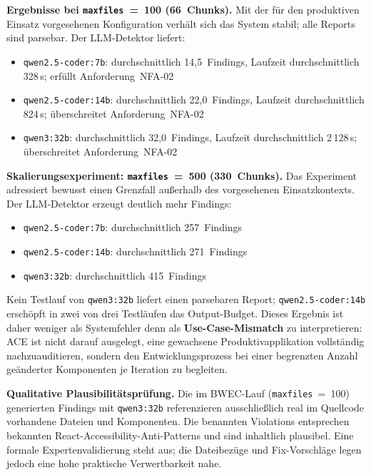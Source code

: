 \textbf{Ergebnisse bei \texttt{maxfiles}~=~100 (66~Chunks).}
Mit der für den produktiven Einsatz vorgesehenen Konfiguration verhält sich das System stabil; alle Reports sind parsebar. Der \ac{LLM}-Detektor liefert:
\begin{itemize}
  \item \texttt{qwen2.5-coder:7b}: durchschnittlich 14{,}5~Findings, Laufzeit durchschnittlich 328\,s; erfüllt Anforderung~\ac{NFA}-02
  \item \texttt{qwen2.5-coder:14b}: durchschnittlich 22{,}0~Findings, Laufzeit durchschnittlich 824\,s; überschreitet Anforderung~\ac{NFA}-02
  \item \texttt{qwen3:32b}: durchschnittlich 32{,}0~Findings, Laufzeit durchschnittlich 2\,128\,s; überschreitet Anforderung~\ac{NFA}-02
\end{itemize}

\textbf{Skalierungsexperiment: \texttt{maxfiles}~=~500 (330~Chunks).}
Das Experiment adressiert bewusst einen Grenzfall außerhalb des vorgesehenen Einsatzkontexts. Der \ac{LLM}-Detektor erzeugt deutlich mehr Findings:
\begin{itemize}
  \item \texttt{qwen2.5-coder:7b}: durchschnittlich 257~Findings
  \item \texttt{qwen2.5-coder:14b}: durchschnittlich 271~Findings
  \item \texttt{qwen3:32b}: durchschnittlich 415~Findings
\end{itemize}
Kein Testlauf von \texttt{qwen3:32b} liefert einen parsebaren Report; \texttt{qwen2.5-coder:14b} erschöpft in zwei von drei Testläufen das Output-Budget. Dieses Ergebnis ist daher weniger als Systemfehler denn als \textbf{Use-Case-Mismatch} zu interpretieren: \ac{ACE} ist nicht darauf ausgelegt, eine gewachsene Produktivapplikation vollständig nachzuauditieren, sondern den Entwicklungsprozess bei einer begrenzten Anzahl geänderter Komponenten je Iteration zu begleiten.

\textbf{Qualitative Plausibilitätsprüfung.}
Die im BWEC-Lauf (\texttt{maxfiles}~=~100) generierten Findings mit \texttt{qwen3:32b} referenzieren ausschließlich real im Quellcode vorhandene Dateien und Komponenten. Die benannten Violations entsprechen bekannten React-Accessibility-Anti-Patterns und sind inhaltlich plausibel. Eine formale Expertenvalidierung steht aus; die Dateibezüge und Fix-Vorschläge legen jedoch eine hohe praktische Verwertbarkeit nahe.


